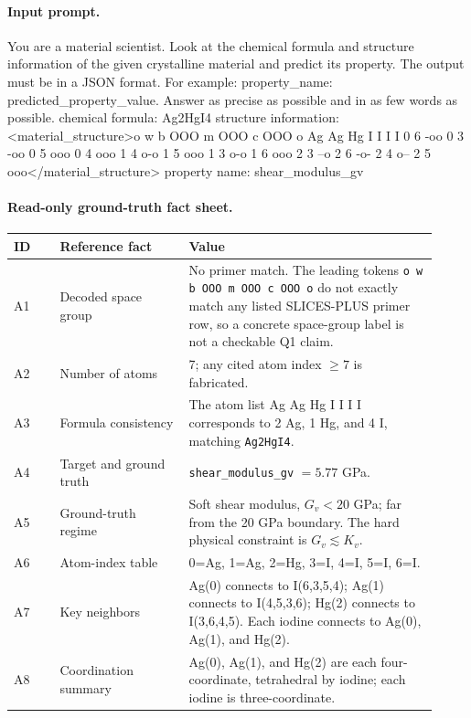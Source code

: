 \begin{appendices}
\paragraph{Input prompt.}
\begin{PromptBlock}
You are a material scientist. Look at the chemical formula and structure information of the given crystalline material and predict its property. The output must be in a JSON format. For example: {property_name: predicted_property_value}. Answer as precise as possible and in as few words as possible.
chemical formula: Ag2HgI4
structure information: <material_structure>o w b OOO m OOO c OOO o Ag Ag Hg I I I I 0 6 -oo 0 3 -oo 0 5 ooo 0 4 ooo 1 4 o-o 1 5 ooo 1 3 o-o 1 6 ooo 2 3 --o 2 6 -o- 2 4 o-- 2 5 ooo</material_structure>
property name: shear_modulus_gv
\end{PromptBlock}

\paragraph{Read-only ground-truth fact sheet.}
\begin{longtable}{P{0.10\linewidth}P{0.28\linewidth}P{0.54\linewidth}}
\toprule
\textbf{ID} & \textbf{Reference fact} & \textbf{Value} \\
\midrule
A1 & Decoded space group & No primer match. The leading tokens \texttt{o w b OOO m OOO c OOO o} do not exactly match any listed SLICES-PLUS primer row, so a concrete space-group label is not a checkable Q1 claim. \\
A2 & Number of atoms & 7; any cited atom index \(\geq 7\) is fabricated. \\
A3 & Formula consistency & The atom list Ag Ag Hg I I I I corresponds to 2 Ag, 1 Hg, and 4 I, matching \texttt{Ag2HgI4}. \\
A4 & Target and ground truth & \texttt{shear\_modulus\_gv} \(= 5.77\) GPa. \\
A5 & Ground-truth regime & Soft shear modulus, \(G_v < 20\) GPa; far from the 20 GPa boundary. The hard physical constraint is \(G_v \lesssim K_v\). \\
A6 & Atom-index table & 0=Ag, 1=Ag, 2=Hg, 3=I, 4=I, 5=I, 6=I. \\
A7 & Key neighbors & Ag(0) connects to I(6,3,5,4); Ag(1) connects to I(4,5,3,6); Hg(2) connects to I(3,6,4,5). Each iodine connects to Ag(0), Ag(1), and Hg(2). \\
A8 & Coordination summary & Ag(0), Ag(1), and Hg(2) are each four-coordinate, tetrahedral by iodine; each iodine is three-coordinate. \\
\bottomrule
\end{longtable}


\end{appendices}
